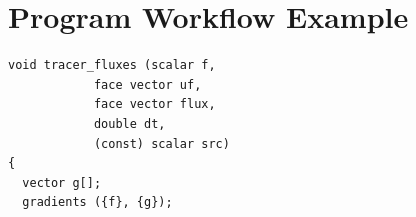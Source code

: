 \documentclass[a4paper]{article}
\newcommand{\para}[1]{\textbf{\emph{\textcolor{para}{#1}}}}
\begin{document}
\section{Program Workflow Example}
\begin{multicols}{2}
 \columnbreak
 \begin{verbatim}
void tracer_fluxes (scalar f,
		    face vector uf,
		    face vector flux,
		    double dt,
		    (const) scalar src)
{
  vector g[];
  gradients ({f}, {g});
 \end{verbatim}
 
\end{multicols}

\begin{center}
\end{center}

\printbibliography
\end{document}
